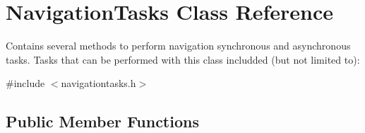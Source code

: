 \hypertarget{class_navigation_tasks}{}\section{Navigation\+Tasks Class Reference}
\label{class_navigation_tasks}


Contains several methods to perform navigation synchronous and asynchronous tasks. Tasks that can be performed with this class includded (but not limited to)\+:  




{\ttfamily \#include $<$navigationtasks.\+h$>$}

\subsection*{Public Member Functions}
